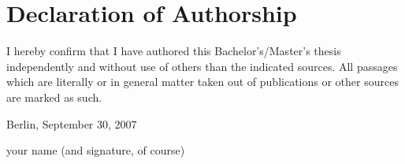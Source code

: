 
\section*{Declaration of Authorship}

I hereby confirm that I have authored this Bachelor's/Master's
thesis independently and without use of others than the indicated
sources. All passages which are literally or in general matter
taken out of publications or other sources are marked as such.
\vspace{1cm}

Berlin, September 30, 2007 \vspace{0.5cm}

your name (and signature, of course)
